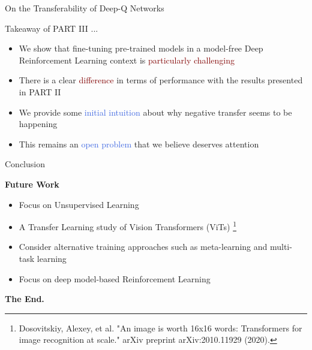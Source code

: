 \documentclass{beamer}
\begin{document}
\begin{frame}{On the Transferability of Deep-Q Networks}
	
	Takeaway of PART III ...
	\bigskip
	\begin{itemize}
		\item We show that fine-tuning pre-trained models in a model-free Deep Reinforcement Learning context is \textcolor{Maroon}{particularly challenging} 
		\item There is a clear \textcolor{Maroon}{difference} in terms of performance with the results presented in PART II
		\item We provide some \textcolor{RoyalBlue}{initial intuition} about why negative transfer seems to be happening
		\item This remains an \textcolor{RoyalBlue}{open problem} that we believe deserves attention
	\end{itemize}

\end{frame}


\begin{frame}{Conclusion}

	\bigskip
	\begin{center}
		\textcolor{skymagenta}{\textbf{Future Work}}
	\end{center}

	\bigskip
	\begin{itemize}
		\item Focus on Unsupervised Learning
		\item A Transfer Learning study of Vision Transformers (ViTs) \footnote{Dosovitskiy, Alexey, et al. "An image is worth 16x16 words: Transformers for image recognition at scale." arXiv preprint arXiv:2010.11929 (2020).}
		\item Consider alternative training approaches such as meta-learning and multi-task learning 
		\item Focus on deep model-based Reinforcement Learning
	\end{itemize}


\end{frame}

\begin{frame}
	\begin{center}
		\textcolor{skymagenta}{\textbf{The End.}}
	\end{center}
\end{frame}
\end{document}
